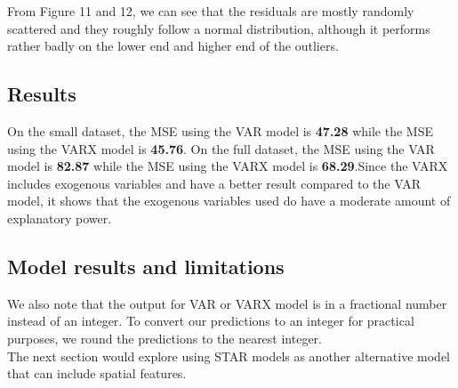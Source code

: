 \documentclass[nonblindrev,msom]{informs3} %
\begin{document}
\noindent From Figure 11 and 12, we can see that the residuals are mostly randomly scattered and they roughly follow a normal distribution, although it performs rather badly on the lower end and higher end of the outliers. 


%
%
%

\subsection{Results}
On the small dataset, the MSE using the VAR model is \textbf{47.28} while the MSE using the VARX model is \textbf{45.76}. On the full dataset, the MSE using the VAR model  is \textbf{82.87} while the MSE using the VARX model is \textbf{68.29}.Since the VARX includes exogenous variables and have a better result compared to the VAR model, it shows that the exogenous variables used do have a moderate amount of explanatory power. 

\subsection{Model results and limitations}

We also note that the output for VAR or VARX model is in a fractional number instead of an integer. To convert our predictions to an integer for practical purposes, we round the predictions to the nearest integer. \\

\noindent The next section would explore using STAR models as another alternative model that can include spatial features. 
\end{document}
